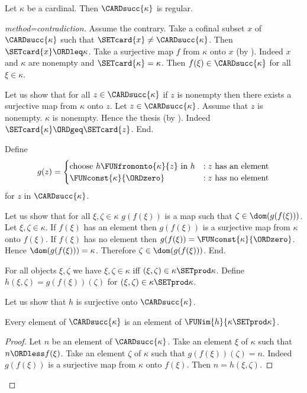 \documentclass{article}
\begin{document}
  \begin{forthel}
    \begin{theorem*}[title=Hausdorff]
      Let $\kappa$ be a cardinal.
      Then $\CARDsucc{\kappa}$ is regular.
    \end{theorem*}
    \begin{proof}[method=contradiction]
      Assume the contrary.
      Take a cofinal subset $x$ of $\CARDsucc{\kappa}$ such that $\SETcard{x} \neq \CARDsucc{\kappa}$.
      Then $\SETcard{x} \ORDleq \kappa$.
      Take a surjective map $f$ from $\kappa$ onto $x$ (by ).
      Indeed $x$ and $\kappa$ are nonempty and $\SETcard{\kappa} = \kappa$.
      Then $f(\xi) \in \CARDsucc{\kappa}$ for all $\xi \in \kappa$.

      Let us show that for all $z \in \CARDsucc{\kappa}$ if $z$ is nonempty then there exists a surjective map from $\kappa$ onto $z$.
        Let $z \in \CARDsucc{\kappa}$.
        Assume that $z$ is nonempty.
        $\kappa$ is nonempty.
        Hence the thesis (by ).
        Indeed $\SETcard{\kappa} \ORDgeq \SETcard{z}$.
      End.

      Define \[ g(z) =
        \begin{cases}
          \text{choose $h \FUNfromonto{\kappa}{z}$ in $h$}
          & : \text{$z$ has an element}
          \\
          \text{$\FUNconst{\kappa}{\ORDzero}$}
          & : \text{$z$ has no element}
        \end{cases}
      \] for $z$ in $\CARDsucc{\kappa}$.

      Let us show that for all $\xi, \zeta \in \kappa$ $g(f(\xi))$ is a map such that $\zeta \in \dom(g(f(\xi)))$.
        Let $\xi, \zeta \in \kappa$.
        If $f(\xi)$ has an element then $g(f(\xi))$ is a surjective map from $\kappa$ onto $f(\xi)$.
        If $f(\xi)$ has no element then $g(f(\xi)) = \FUNconst{\kappa}{\ORDzero}$.
        Hence $\dom(g(f(\xi))) = \kappa$.
        Therefore $\zeta \in \dom(g(f(\xi)))$.
      End.

      For all objects $\xi, \zeta$ we have $\xi, \zeta \in \kappa$ iff $(\xi, \zeta) \in \kappa \SETprod \kappa$.
      Define $h(\xi,\zeta) = g(f(\xi))(\zeta)$ for $(\xi,\zeta) \in \kappa \SETprod \kappa$.

      Let us show that $h$ is surjective onto $\CARDsucc{\kappa}$.

        Every element of $\CARDsucc{\kappa}$ is an element of $\FUNim{h}{\kappa \SETprod \kappa}$.
        \begin{proof}
          Let $n$ be an element of $\CARDsucc{\kappa}$.
          Take an element $\xi$ of $\kappa$ such that $n \ORDless f(\xi)$.
          Take an element $\zeta$ of $\kappa$ such that $g(f(\xi))(\zeta) = n$.
          Indeed $g(f(\xi))$ is a surjective map from $\kappa$ onto $f(\xi)$.
          Then $n = h(\xi,\zeta)$.
        \end{proof}


\end{proof}
\end{forthel}
\end{document}
